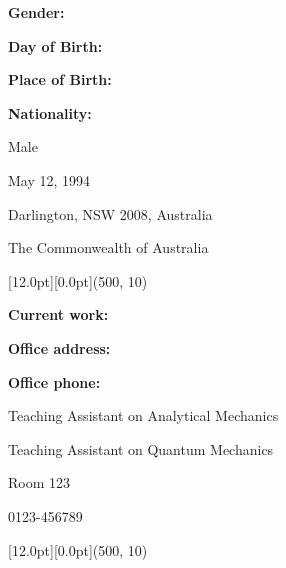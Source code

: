 \documentclass[12pt,a4paper]{report}
\newcommand{\myworkA}{Teaching Assistant on Analytical Mechanics}
\newcommand{\myworkB}{Teaching Assistant on Quantum Mechanics}
\begin{document}
    \begin{center}
        \begin{minipage}[t]{120pt}
            \textbf{Gender:}\par
            \textbf{Day of Birth:}\par
            \textbf{Place of Birth:}\par
            \textbf{Nationality:}\par
        \end{minipage}
        \begin{minipage}[t]{340pt}
            Male \par
            May 12, 1994 \par
            Darlington, NSW 2008, Australia \par
            The Commonwealth of Australia \par
        \end{minipage}
    \end{center}
    \begin{center}\begin{minipage}[t]{512pt}
        \colorbox{subtitlecolor}{\raisebox{0pt}[12.0pt][0.0pt]{\makebox(500, 10){
            \textcolor{white}{\ttfamily{}\selectfont{}}}}}\end{minipage}\end{center}
    \begin{center}
        \begin{minipage}[t]{120pt}
            \textbf{Current work:} \par
            \quad \par
            \textbf{Office address:} \par
            \textbf{Office phone:} \par
        \end{minipage}
        \begin{minipage}[t]{340pt}
            {\myworkA} \par
            {\myworkB} \par
            Room 123 \par
            0123-456789 \par
        \end{minipage}
    \end{center}
    \begin{center}\begin{minipage}[t]{512pt}
        \colorbox{subtitlecolor}{\raisebox{0pt}[12.0pt][0.0pt]{\makebox(500, 10){
            \textcolor{white}{\ttfamily{}\selectfont{}}}}}\end{minipage}\end{center}
\end{document}
